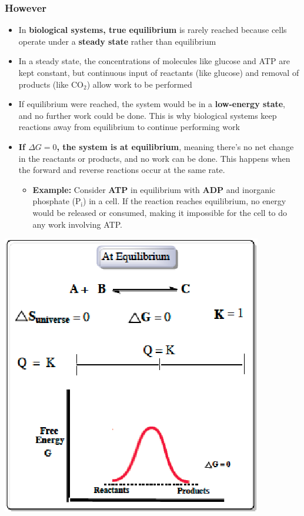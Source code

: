 \documentclass[10pt]{article}
\begin{document}
\subsubsection*{However}
\begin{itemize}
    \item In \textbf{biological systems, true equilibrium} is rarely reached because cells operate under a \textbf{steady state} rather than equilibrium
    \item In a steady state, the concentrations of molecules like glucose and ATP are kept constant, but continuous input of reactants (like glucose) and removal of products (like CO$_2$) allow work to be performed
    \item If equilibrium were reached, the system would be in a \textbf{low-energy state}, and no further work could be done. This is why biological systems keep reactions away from equilibrium to continue performing work
\end{itemize}
\begin{itemize}
    \item \textbf{If $\Delta G = 0$, the system is at equilibrium}, meaning there's no net change in the reactants or products, and no work can be done.  This happens when the forward and reverse reactions occur at the same rate.
    \begin{itemize}
        \item \textbf{Example:} Consider \textbf{ATP} in equilibrium with \textbf{ADP} and inorganic phosphate (P$_\text{i}$) in a cell.  If the reaction reaches equilibrium, no energy would be released or consumed, making it impossible for the cell to do any work involving ATP.
    \end{itemize}
\end{itemize}
\begin{center}
    \includegraphics[scale=0.9]{L3_11.png}
\end{center}
\end{document}

